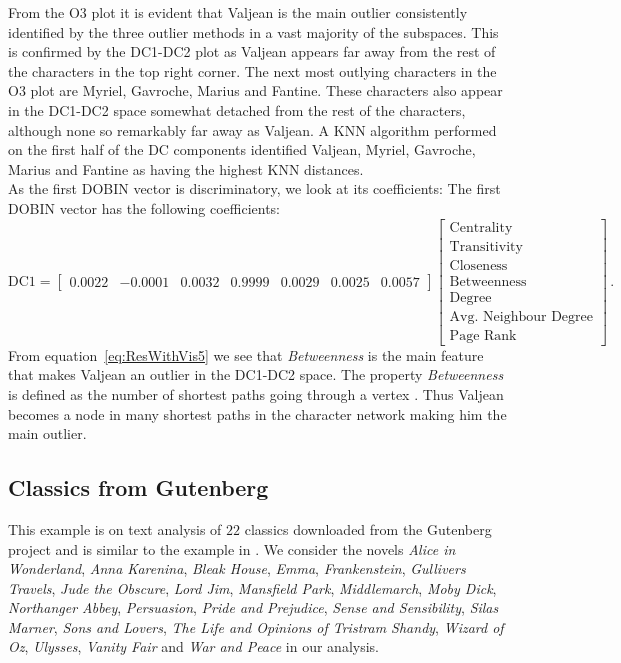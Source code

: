 \documentclass[11pt]{article}
\begin{document}
From the O3 plot it is evident that Valjean is the main outlier consistently identified by the three outlier methods in a vast majority of the subspaces.  This is confirmed by the DC1-DC2 plot as Valjean appears far away from the rest of the characters in the top right corner.  The next most outlying characters in the O3 plot are Myriel, Gavroche, Marius and Fantine. These characters also appear in the DC1-DC2 space somewhat detached from the rest of the characters, although none so remarkably far away as Valjean. A KNN algorithm performed on the first half of the DC components identified Valjean, Myriel, Gavroche, Marius and Fantine as having the highest KNN distances. \\

As the first DOBIN vector is discriminatory, we look at its coefficients:
The first DOBIN vector has the following coefficients:
\begin{equation}\label{eq:ResWithVis5}
    \text{DC1} = \begin{bmatrix}
    0.0022 & -0.0001 &  0.0032 & 0.9999 & 0.0029 & 0.0025 & 0.0057  
    \end{bmatrix}
    \begin{bmatrix}
    \text{Centrality} \\
    \text{Transitivity} \\
    \text{Closeness} \\
    \text{Betweenness} \\
    \text{Degree} \\
    \text{Avg. Neighbour Degree}\\
    \text{Page Rank}
    \end{bmatrix} \, .
\end{equation}
From equation~\eqref{eq:ResWithVis5} we see that \textit{Betweenness} is the main feature that makes Valjean an outlier in the DC1-DC2 space. The property \textit{Betweenness} is defined as the number of shortest paths going through a vertex \citep{igraph}. Thus Valjean becomes a node in many shortest paths in the character network making him the main outlier.  

\subsection{Classics from Gutenberg}\label{sec:ResWithVis6}
This example is on text analysis of $22$ classics downloaded from the Gutenberg project \citep{gutenberg} and  is similar to the example in \cite{wilkinson2017visualizing}. We consider the novels \textit{Alice in Wonderland}, \textit{Anna Karenina}, \textit{Bleak House}, \textit{Emma}, \textit{Frankenstein}, \textit{Gullivers Travels}, \textit{Jude the Obscure}, \textit{Lord Jim}, \textit{Mansfield Park}, \textit{Middlemarch}, \textit{Moby Dick}, \textit{Northanger Abbey}, \textit{Persuasion}, \textit{Pride and Prejudice}, \textit{Sense and Sensibility}, \textit{Silas Marner}, \textit{Sons and Lovers}, \textit{The Life and Opinions of Tristram Shandy}, \textit{Wizard of Oz}, \textit{Ulysses}, \textit{Vanity Fair} and  \textit{War and Peace} in our analysis. \\
\end{document}
